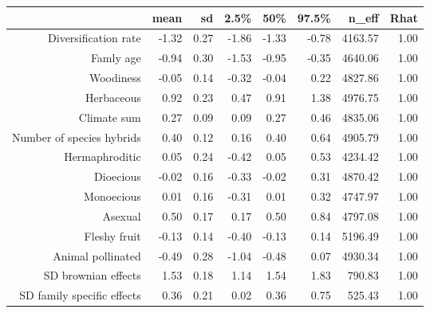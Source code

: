\begin{table}[ht]
\centering
\begin{tabular}{rrrrrrrr}
  \hline
 & mean & sd & 2.5\% & 50\% & 97.5\% & n\_eff & Rhat \\ 
  \hline
Diversification rate & -1.32 & 0.27 & -1.86 & -1.33 & -0.78 & 4163.57 & 1.00 \\ 
  Famly age & -0.94 & 0.30 & -1.53 & -0.95 & -0.35 & 4640.06 & 1.00 \\ 
  Woodiness & -0.05 & 0.14 & -0.32 & -0.04 & 0.22 & 4827.86 & 1.00 \\ 
  Herbaceous & 0.92 & 0.23 & 0.47 & 0.91 & 1.38 & 4976.75 & 1.00 \\ 
  Climate sum & 0.27 & 0.09 & 0.09 & 0.27 & 0.46 & 4835.06 & 1.00 \\ 
  Number of species hybrids & 0.40 & 0.12 & 0.16 & 0.40 & 0.64 & 4905.79 & 1.00 \\ 
  Hermaphroditic & 0.05 & 0.24 & -0.42 & 0.05 & 0.53 & 4234.42 & 1.00 \\ 
  Dioecious & -0.02 & 0.16 & -0.33 & -0.02 & 0.31 & 4870.42 & 1.00 \\ 
  Monoecious & 0.01 & 0.16 & -0.31 & 0.01 & 0.32 & 4747.97 & 1.00 \\ 
  Asexual & 0.50 & 0.17 & 0.17 & 0.50 & 0.84 & 4797.08 & 1.00 \\ 
  Fleshy fruit & -0.13 & 0.14 & -0.40 & -0.13 & 0.14 & 5196.49 & 1.00 \\ 
  Animal pollinated & -0.49 & 0.28 & -1.04 & -0.48 & 0.07 & 4930.34 & 1.00 \\ 
  SD brownian effects & 1.53 & 0.18 & 1.14 & 1.54 & 1.83 & 790.83 & 1.00 \\ 
  SD family specific effects & 0.36 & 0.21 & 0.02 & 0.36 & 0.75 & 525.43 & 1.00 \\ 
   \hline
\end{tabular}
\end{table}
